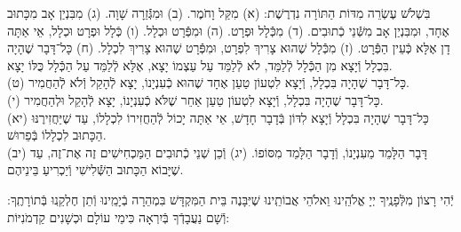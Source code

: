 \documentclass[twoside, openany, parskip=half, 11pt]{book}
\begin{document}
בִּשְׁלֹשׁ עֶשְׂרֵה מִדּוֹת הַתּוֹרָה נִדְרֶשֶׁת:\hfill \break
(א) מִקַּל וָחֹמֶר.\hfill \break
(ב) וּמִגְּֿֿזֵרָה שָׁוָה.\hfill \break
(ג) מִבִּנְיַן אָב מִכָּתוּב אֶחָד, וּמִבִּנְיַן אָב מִשְּֿֿׁנֵי כְֿתוּבִים.\hfill \break
(ד) מִכְּֿֿלָל וּפְרָט.\hfill \break
(ה) וּמִפְּֿֿרָט וּכְלָל.\hfill \break
(ו) כְּֿלָל וּפְרָט וּכְלָל, אֵי אַתָּה דָן אֶלָּא כְּֿעֵין הַפְּֿֿרָט.\hfill \break
(ז) מִכְּֿֿלָל שֶׁהוּא צָרִיךְ לִפְרָט, וּמִפְּֿֿרָט שֶׁהוּא צָרִיךְ לִכְלָל.\hfill \break
(ח) כָּל־דָּבָר שֶׁהָיָה בִּכְלָל וְֿיָצָא מִן הַכְּֿֿלָל לְֿלַמֵּד, לֹא לְֿלַמֵּד עַל עַצְמוֹ יָצָא, אֶלָּא לְֿלַמֵּד עַל הַכְּֿֿלָל כֻּלּוֹ יָצָא. \\
(ט) כָּל־דָּבָר שֶׁהָיָה בִּכְלָל, וְֿיָצָא לִטְעוֹן טַעַן אֶחָד שֶׁהוּא כְֿעִנְיָנוֹ, יָצָא לְֿהָקֵל וְֿלֹא לְֿהַחֲמִיר. \\
(י) כָּל־דָּבָר שֶׁהָיָה בִּכְלָל, וְֿיָצָא לִטְעוֹן טַעַן אַחֵר שֶׁלֹּא כְֿעִנְיָנוֹ, יָצָא לְֿהָקֵל וּלְהַחֲמִיר. \\
(יא) כָּל־דָּבָר שֶׁהָיָה בִּכְלָל וְֿיָצָא לִדּוֹן בְּֿדָבָר חָדָשׁ, אֵי אַתָּה יָכוֹל לְֿהַחֲזִירוֹ לִכְלָלוֹ, עַד שֶׁיַּחֲזִירֶנּוּ הַכָּתוּב לִכְלָלוֹ בְּֿפֵרוּשׁ. \\
(יב) דָּבָר הַלָּמֵד מֵעִנְיָנוֹ, וְֿדָבָר הַלָּמֵד מִסּוֹפוֹ.\hfill \break
(יג) וְֿכֵן שְׁנֵי כְֿתוּבִים הַמַּכְחִישִׁים זֶה אֶת־זֶה, עַד שֶׁיָּבוֹא הַכָּתוּב הַשְּֿֿׁלִישִׁי וְֿיַכְרִיעַ בֵּינֵיהֶם.

יְֿהִי רָצוֹן מִלְּֿפָנֶֽיךָ יְיָ אֱלֹהֵֽינוּ וֵאלֹהֵי אֲבוֹתֵֽינוּ שֶׁיִּבָּנֶה בֵּית הַמִּקְדָּשׁ בִּמְהֵרָה בְֿיָמֵֽינוּ וְֿתֵן חֶלְקֵֽנוּ בְּֿתוֹרָתֶֽךָ: וְֿשָׁם נַעֲבָדְֿךָ בְּֿיִרְאָה כִּימֵי עוֹלָם וּכְשָׁנִים קַדְמֹנִיּוֹת:


\rabbiskaddish
\end{document}
